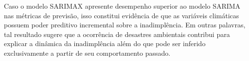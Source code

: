 Caso o modelo SARIMAX apresente desempenho superior ao modelo SARIMA nas
métricas de previsão, isso constitui evidência de que as variáveis climáticas
possuem poder preditivo incremental sobre a inadimplência. Em outras
palavras, tal resultado sugere que a ocorrência de desastres ambientais
contribui para explicar a dinâmica da inadimplência além do que pode ser
inferido exclusivamente a partir de seu comportamento passado.